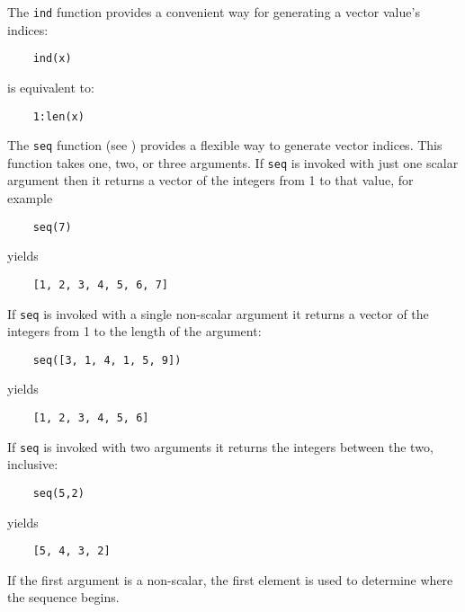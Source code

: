 The {\tt ind} function provides a convenient way for generating
a vector value's indices:
\begin{verbatim}
    ind(x)
\end{verbatim}
is equivalent to:
\begin{verbatim}
    1:len(x)
\end{verbatim}

The {\tt seq} function (see ) provides a
flexible way to generate vector indices.  This function takes one,
two, or three arguments. If {\tt seq} is invoked with just one scalar
argument then it returns a vector of the integers from 1 to that value,
for example
\begin{verbatim}
    seq(7)
\end{verbatim}
yields
\begin{verbatim}
    [1, 2, 3, 4, 5, 6, 7]
\end{verbatim}
If {\tt seq} is invoked with a single non-scalar argument
it returns a vector of the integers from 1 to the length of the argument:
\begin{verbatim}
    seq([3, 1, 4, 1, 5, 9])
\end{verbatim}
yields
\begin{verbatim}
    [1, 2, 3, 4, 5, 6]
\end{verbatim}

If {\tt seq} is invoked with two arguments it returns
the integers between the two, inclusive:
\begin{verbatim}
    seq(5,2)
\end{verbatim}
yields
\begin{verbatim}
    [5, 4, 3, 2]
\end{verbatim}
If the first argument is a non-scalar, the first element is used
to determine where the sequence begins.

